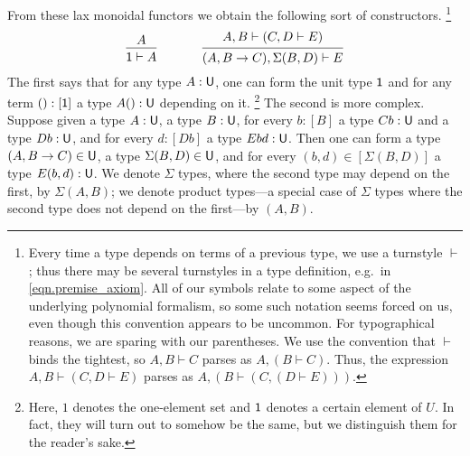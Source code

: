 \documentclass[11pt, one side, article]{memoir}
\theoremstyle{definition}
\theoremstyle{plain}
\newcommand{\tn}[1]{\textnormal{#1}}
\newcommand{\0}{\textsf{0}}
\newcommand{\1}{\tn{\textsf{1}}}
\newcommand{\U}{\tn{\textsf{U}}}
\begin{document}
From these lax monoidal functors we obtain the following sort of constructors.%
\footnote{Every time a type depends on terms of a previous type, we use a turnstyle $\vdash$; thus there may be several turnstyles in a type definition, e.g.\ in \eqref{eqn.premise_axiom}. All of our symbols relate to some aspect of the underlying polynomial formalism, so some such notation seems forced on us, even though this convention appears to be uncommon. For typographical reasons, we are sparing with our parentheses. We use the convention that $\vdash$ binds the tightest, so $A,B\vdash C$ parses as $A,(B\vdash C)$. Thus, the expression $A, B\vdash (C, D\vdash E)$ parses as $A,(B\vdash(C, (D\vdash E)))$.}
\begin{equation}\label{eqn.premise_axiom}
  \begin{prooftree}
    \Hypo{A}
    \Infer1{\1\vdash A}
  \end{prooftree}
\hspace{.5in}
  \begin{prooftree}
    \Hypo{A, B\vdash (C, D\vdash E)}
    \Infer1{(A,B\to C),\Sigma(B,D)\vdash E}
  \end{prooftree}
\end{equation}
The first says that for any type $A:\U$, one can form the unit type $\1$ and for any term $():[\1]$ a type $A():\U$ depending on it.%
\footnote{Here, $1$ denotes the one-element set and $\1$ denotes a certain element of $U$. In fact, they will turn out to somehow be the same, but we distinguish them for the reader's sake.}
 The second is more complex. Suppose given a type $A:\U$, a type $B:\U$, for every $b:[B]$ a type $Cb:\U$ and a type $Db:\U$, and for every $d:[Db]$ a type $Ebd:\U$. Then one can form a type $(A,B\to C)\in \U$, a type $\Sigma(B,D)\in \U$, and for every $(b, d)\in [\Sigma(B,D)]$ a type $E(b,d):\U$. We denote $\Sigma$ types, where the second type may depend on the first, by $\Sigma(A,B)$; we denote product types---a special case of $\Sigma$ types where the second type does not depend on the first---by $(A,B)$.
\end{document}
